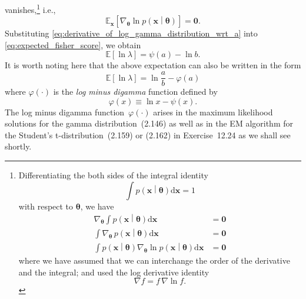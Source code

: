 \documentclass[12pt,a4paper]{article}
\begin{document}
vanishes,\footnote{%
Differentiating the both sides of the integral identity
\begin{equation}
\int p\left(\mathbf{x}\middle|\bm{\theta}\right) \mathrm{d}\mathbf{x} = 1
\end{equation}
with respect to $\bm{\theta}$, we have
\begin{align}
\nabla_{\bm{\theta}} \int p\left(\mathbf{x}\middle|\bm{\theta}\right) \mathrm{d}\mathbf{x}
&= \mathbf{0} \\
\int \nabla_{\bm{\theta}} \, p\left(\mathbf{x}\middle|\bm{\theta}\right) \mathrm{d}\mathbf{x}
&= \mathbf{0} \\
\int p\left(\mathbf{x}\middle|\bm{\theta}\right)
\nabla_{\bm{\theta}} \ln p\left(\mathbf{x}\middle|\bm{\theta}\right) \mathrm{d}\mathbf{x}
&= \mathbf{0}
\end{align}
where we have assumed that we can interchange the order of the derivative and the integral;
and used the log derivative identity
\begin{equation}
\nabla f = f \, \nabla \ln f .
\end{equation}
}
i.e.,
\begin{equation}
\mathbb{E}_{\mathbf{x}}\left[
\nabla_{\bm{\theta}} \ln p\left(\mathbf{x}\middle|\bm{\theta}\right)
\right]
= \mathbf{0} .
\label{eq:expected_fisher_score}
\end{equation}
Substituting \eqref{eq:derivative_of_log_gamma_distribution_wrt_a} into
\eqref{eq:expected_fisher_score},
we obtain
\begin{equation}
\mathbb{E}\left[ \ln \lambda \right] = \psi(a) - \ln b .
\end{equation}
It is worth noting here that the above expectation can also be written in the form
\begin{equation}
\mathbb{E}\left[ \ln \lambda \right] = \ln\frac{a}{b} - \varphi(a)
\end{equation}
where $\varphi(\cdot)$ is the \emph{log minus digamma} function defined by
\begin{equation}
\varphi(x) \equiv \ln x - \psi(x) .
\label{eq:log_minus_digamma_function}
\end{equation}
The log minus digamma function~$\varphi(\cdot)$ arises in
the maximum likelihood solutions for the gamma distribution~(2.146) as well as
in the EM algorithm for the Student's t-distribution~(2.159) or (2.162) in Exercise~12.24
as we shall see shortly.
\end{document}
